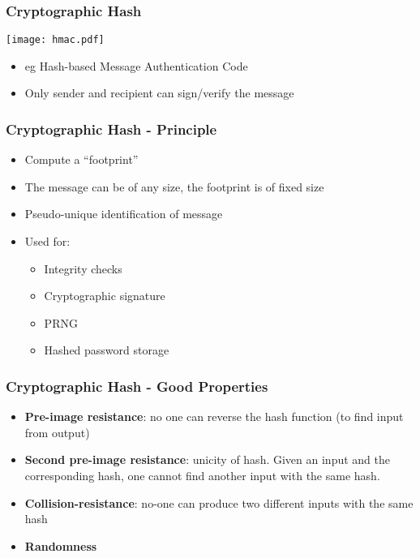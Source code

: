 \documentclass[
hyperref={pdfpagelabels=false}
,xcolor=table
]
{beamer}
\begin{document}
\begin{frame}
  \frametitle{Cryptographic Hash}


  \begin{center}
    \texttt{[image: hmac.pdf]}
  \end{center}
  
  \begin{itemize}
  \item eg Hash-based Message Authentication Code
  \item Only sender and recipient can sign/verify the message
  \end{itemize}
  
\end{frame}

\begin{frame}
  \frametitle{Cryptographic Hash - Principle}

  \begin{itemize}
  \item Compute a ``footprint''
  \item The message can be of any size, the footprint is of fixed size
  \item Pseudo-unique identification of message
  \item Used for:
    \begin{itemize}
    \item Integrity checks
    \item Cryptographic signature
    \item PRNG
    \item Hashed password storage
    \end{itemize}
  \end{itemize}
\end{frame}


\begin{frame}
  \frametitle{Cryptographic Hash - Good Properties}

  \begin{itemize}
  \item \textbf{Pre-image resistance}: no one can reverse the hash function (to find input from output)
  \item \textbf{Second pre-image resistance}: unicity of hash. Given an input and the corresponding hash, one cannot find another input with the same hash. 
  \item \textbf{Collision-resistance}: no-one can produce two different inputs with the same hash
  \item \textbf{Randomness}
  \end{itemize}
\end{frame}
\end{document}
